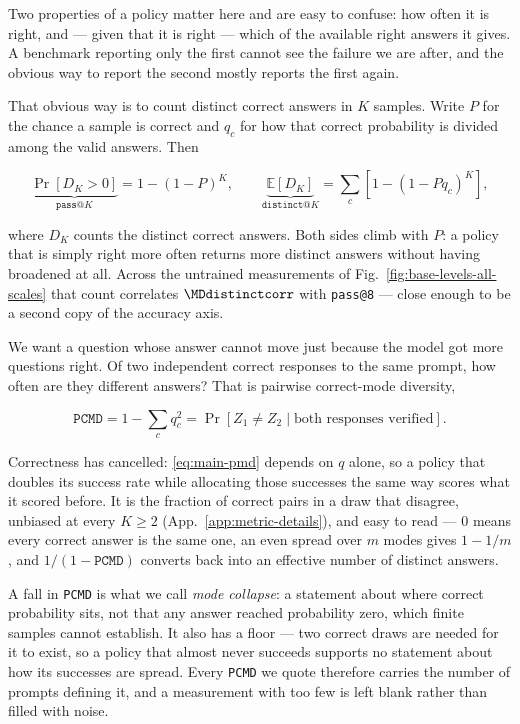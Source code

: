 \documentclass{article}
\newcommand{\1}{\mathbf 1}
\newcommand{\E}{\mathbb E}
\newcommand{\pmd}{\texttt{PCMD}}
\theoremstyle{remark}
\theoremstyle{definition}
\theoremstyle{plain}
\begin{document}
Two properties of a policy matter here and are easy to confuse: how often it is
right, and --- given that it is right --- which of the available right answers
it gives. A benchmark reporting only the first cannot see the failure we are
after, and the obvious way to report the second mostly reports the first again.

That obvious way is to count distinct correct answers in $K$ samples. Write $P$
for the chance a sample is correct and $q_c$ for how that correct probability is
divided among the valid answers. Then

\begin{equation}
 \underbrace{\Pr[D_K>0]}_{\texttt{pass@}K}=1-(1-P)^K,
 \qquad
 \underbrace{\E[D_K]}_{\texttt{distinct@}K}
 =\sum_c[1-(1-Pq_c)^K],
 \label{eq:main-occupancy}
\end{equation}

where $D_K$ counts the distinct correct answers. Both sides climb with $P$: a
policy that is simply right more often returns more distinct answers without
having broadened at all. Across the \MDcells{} untrained measurements of
Fig.~\ref{fig:base-levels-all-scales} that count correlates
$\MDdistinctcorr$ with \texttt{pass@8} --- close enough to be a second copy of
the accuracy axis.

We want a question whose answer cannot move just because the model got more
questions right. Of two independent correct responses to the same prompt, how
often are they different answers? That is pairwise correct-mode diversity,

\begin{equation}
 \pmd = 1-\sum_c q_c^2
 = \Pr[Z_1\ne Z_2\mid \text{both responses verified}].
 \label{eq:main-pmd}
\end{equation}

Correctness has cancelled: \eqref{eq:main-pmd} depends on $q$ alone, so a policy
that doubles its success rate while allocating those successes the same way
scores what it scored before. It is the fraction of correct pairs in a draw that
disagree, unbiased at every $K\ge2$ (App.~\ref{app:metric-details}), and easy
to read --- $0$ means every correct answer is the same one, an even spread over
$m$ modes gives $1-1/m$, and $1/(1-\pmd{})$ converts back into an effective
number of distinct answers.

A fall in \pmd{} is what we call \emph{mode collapse}: a statement about where
correct probability sits, not that any answer reached probability zero, which
finite samples cannot establish. It also has a floor --- two correct draws are
needed for it to exist, so a policy that almost never succeeds supports no
statement about how its successes are spread. Every \pmd{} we quote therefore
carries the number of prompts defining it, and a measurement with too few is
left blank rather than filled with noise.
\end{document}
